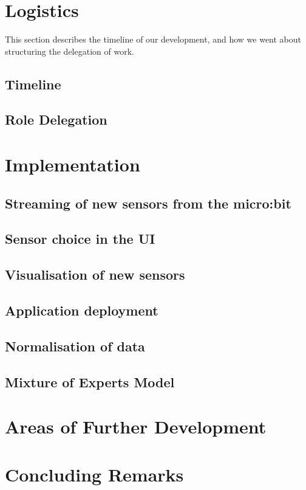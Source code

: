 \documentclass{article}
\begin{document}
\section{Logistics}%
\label{sec:logistics}

This section describes the timeline of our development, and how we went about structuring the delegation of work.

\subsection{Timeline}%
\label{subsec:timeline}


\subsection{Role Delegation}%
\label{subsec:delegation}

\section{Implementation}%
\label{sec:implementation}

\subsection{Streaming of new sensors from the micro:bit}%
\label{subsec:label}

\subsection{Sensor choice in the UI}%
\label{subsec:label}


\subsection{Visualisation of new sensors}%
\label{subsec:sensorvis}

\subsection{Application deployment}%
\label{subsec:deployment}

\subsection{Normalisation of data}%
\label{subsec:datanorm}

\subsection{Mixture of Experts Model}%
\label{subsec:moe}

\section{Areas of Further Development}%
\label{sec:development}

\section{Concluding Remarks}%
\label{sec:conclusion}
\end{document}

